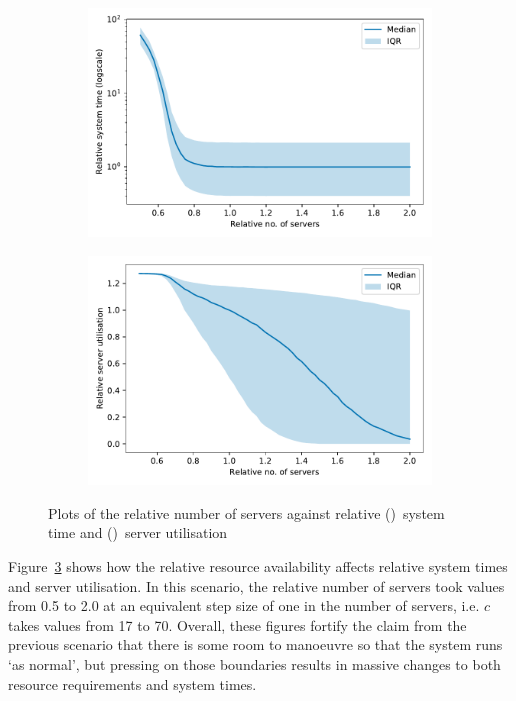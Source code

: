 \begin{figure}
    \centering
    \begin{subfigure}{\imgwidth}
        \includegraphics[width=\linewidth]{servers_time}
        \caption{}\label{fig:servers_time}
    \end{subfigure}

    \begin{subfigure}{\imgwidth}
        \includegraphics[width=\linewidth]{servers_util}
        \caption{}\label{fig:servers_util}
    \end{subfigure}
    \caption{%
        Plots of the relative number of servers against relative
        ()~system time and
        ()~server utilisation
    }\label{fig:servers}
\end{figure}

Figure~\ref{fig:servers} shows how the relative resource availability affects
relative system times and server utilisation. In this scenario, the relative
number of servers took values from 0.5 to 2.0 at an equivalent step size of one
in the number of servers, i.e. \(c\) takes values from 17 to 70. Overall, these
figures fortify the claim from the previous scenario that there is some room to
manoeuvre so that the system runs `as normal', but pressing on those boundaries
results in massive changes to both resource requirements and system times.

